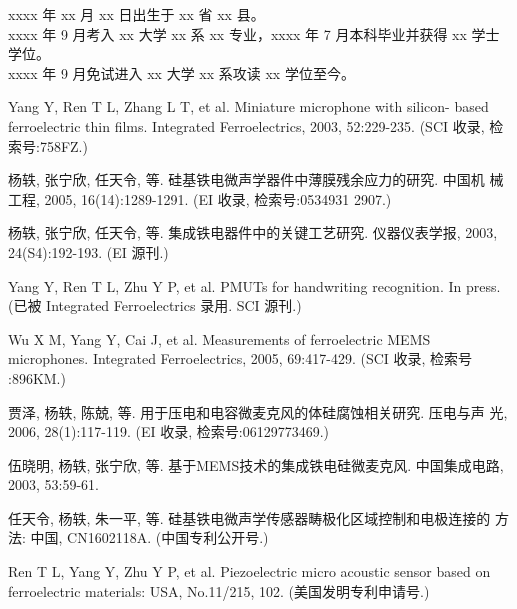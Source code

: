\noindent xxxx 年 xx 月 xx 日出生于 xx 省 xx 县。\\
xxxx 年 9 月考入 xx 大学 xx 系 xx 专业，xxxx 年 7 月本科毕业并获得 xx 学士学位。\\
xxxx 年 9 月免试进入 xx 大学 xx 系攻读 xx 学位至今。

\begin{enumerate}[{[}1{]}]
\item Yang Y, Ren T L, Zhang L T, et al. Miniature microphone with silicon-
  based ferroelectric thin films. Integrated Ferroelectrics, 2003,
  52:229-235. (SCI 收录, 检索号:758FZ.)
\item 杨轶, 张宁欣, 任天令, 等. 硅基铁电微声学器件中薄膜残余应力的研究. 中国机
  械工程, 2005, 16(14):1289-1291. (EI 收录, 检索号:0534931 2907.)
\item 杨轶, 张宁欣, 任天令, 等. 集成铁电器件中的关键工艺研究. 仪器仪表学报,
  2003, 24(S4):192-193. (EI 源刊.)
\item Yang Y, Ren T L, Zhu Y P, et al. PMUTs for handwriting recognition. In
  press. (已被 Integrated Ferroelectrics 录用. SCI 源刊.)
\item Wu X M, Yang Y, Cai J, et al. Measurements of ferroelectric MEMS
  microphones. Integrated Ferroelectrics, 2005, 69:417-429. (SCI 收录, 检索号
  :896KM.)
\item 贾泽, 杨轶, 陈兢, 等. 用于压电和电容微麦克风的体硅腐蚀相关研究. 压电与声
  光, 2006, 28(1):117-119. (EI 收录, 检索号:06129773469.)
\item 伍晓明, 杨轶, 张宁欣, 等. 基于MEMS技术的集成铁电硅微麦克风. 中国集成电路, 
  2003, 53:59-61.
\end{enumerate}

\begin{enumerate}[{[}1{]}]
\item 任天令, 杨轶, 朱一平, 等. 硅基铁电微声学传感器畴极化区域控制和电极连接的
  方法: 中国, CN1602118A. (中国专利公开号.)
\item Ren T L, Yang Y, Zhu Y P, et al. Piezoelectric micro acoustic sensor
  based on ferroelectric materials: USA, No.11/215, 102. (美国发明专利申请号.)
\end{enumerate}
